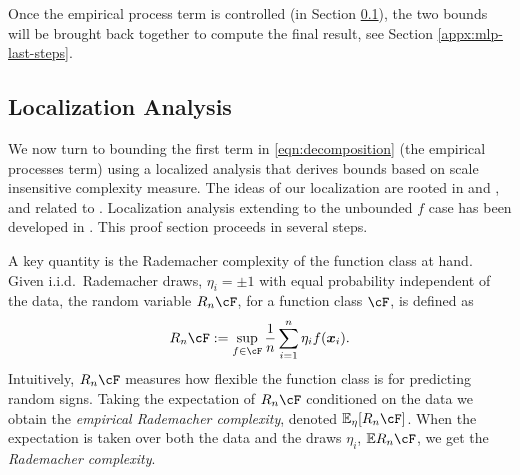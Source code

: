 \documentclass[11pt]{article}
\numberwithin{equation}{section}
\theoremstyle{definition}
\newcommand{\E}{\mathbb{E}}
\newcommand{\bx}{\bm{x}}
\begin{document}
\begin{appendices}
	Once the empirical process term is controlled (in Section \ref{appx:localization}), the two bounds will be brought back together to compute the final result, see Section \ref{appx:mlp-last-steps}.






\subsection{Localization Analysis}
	\label{appx:localization}


We now turn to bounding the first term in \eqref{eqn:decomposition} (the empirical processes term) using a localized analysis that derives bounds based on scale insensitive complexity measure. The ideas of our localization are rooted in \cite{koltchinskii2000rademacher} and \cite{bartlett2005local}, and related to \cite{Koltchinskii2011_book}. Localization analysis extending to the unbounded $f$ case has been developed in \cite{mendelson2014learning, liang2015learning}. This proof section proceeds in several steps. 
	
	
A key quantity is the Rademacher complexity of the function class at hand. Given i.i.d.\ Rademacher draws, $\eta_i = \pm 1$ with equal probability independent of the data, the random variable $R_n \cF$, for a function class $\cF$, is defined as
\[
	R_n \cF : = \sup_{f \in \cF} \frac{1}{n}\sum_{i=1}^n \eta_i f(\bx_i).
\]
Intuitively, $R_n \cF$ measures how flexible the function class is for predicting random signs. Taking the expectation of $R_n \cF$ conditioned on the data we obtain the \emph{empirical Rademacher complexity}, denoted $\E_\eta [R_n \cF]$. When the expectation is taken over both the data and the draws $\eta_i$, $\E R_n \cF$, we get the \emph{Rademacher complexity}. 







\end{appendices}
\end{document}
